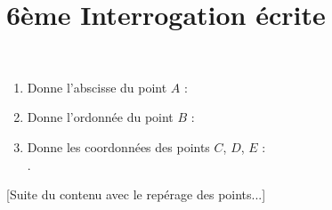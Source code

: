 \documentclass[10pt,openany]{book}
\begin{document}
\pagestyle{empty}
\section*{6\`eme Interrogation \'ecrite}

\\
\begin{enumerate}
\item Donne l'abscisse du point $A$ : \dotfill
\item Donne l'ordonn\'ee du point $B$ : \dotfill
\item Donne les coordonn\'ees des points $C$, $D$, $E$ :\\
.\dotfill
\end{enumerate}

[Suite du contenu avec le repérage des points...]
\end{document}

